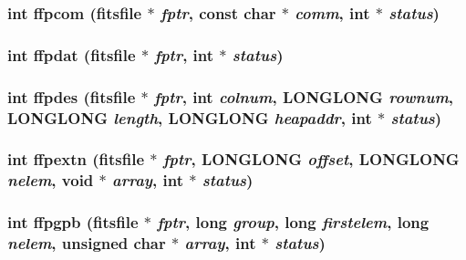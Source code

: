 \subsubsection{\setlength{\rightskip}{0pt plus 5cm}int ffpcom (\bf{fitsfile} $\ast$ {\em fptr}, const char $\ast$ {\em comm}, int $\ast$ {\em status})}\label{test_2roimasker_2fitsio_8h_50c9a1cbd0f53a16f333f7436c3956eb}


\subsubsection{\setlength{\rightskip}{0pt plus 5cm}int ffpdat (\bf{fitsfile} $\ast$ {\em fptr}, int $\ast$ {\em status})}\label{test_2roimasker_2fitsio_8h_4d72da1386c269cf78d32f5be46e794b}


\subsubsection{\setlength{\rightskip}{0pt plus 5cm}int ffpdes (\bf{fitsfile} $\ast$ {\em fptr}, int {\em colnum}, \bf{LONGLONG} {\em rownum}, \bf{LONGLONG} {\em length}, \bf{LONGLONG} {\em heapaddr}, int $\ast$ {\em status})}\label{test_2roimasker_2fitsio_8h_af28c8af662d8aedcc2091f08cddfc92}


\subsubsection{\setlength{\rightskip}{0pt plus 5cm}int ffpextn (\bf{fitsfile} $\ast$ {\em fptr}, \bf{LONGLONG} {\em offset}, \bf{LONGLONG} {\em nelem}, void $\ast$ {\em array}, int $\ast$ {\em status})}\label{test_2roimasker_2fitsio_8h_322dc9ce9e90ada6f83fa19b732b4df9}


\subsubsection{\setlength{\rightskip}{0pt plus 5cm}int ffpgpb (\bf{fitsfile} $\ast$ {\em fptr}, long {\em group}, long {\em firstelem}, long {\em nelem}, unsigned char $\ast$ {\em array}, int $\ast$ {\em status})}\label{test_2roimasker_2fitsio_8h_03266d9bd2aaccb23f3e873903598df5}


